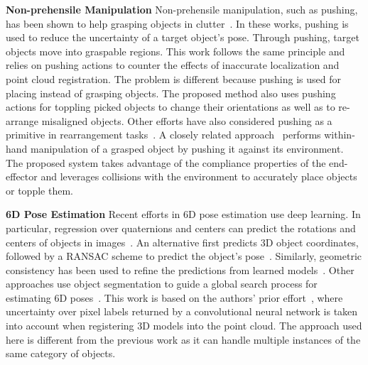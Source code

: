 \noindent \textbf{Non-prehensile Manipulation}
Non-prehensile manipulation, such as pushing, has been shown to help grasping objects in clutter~\cite{Dogar-2011-7322,Dogar22012}. In these works, pushing is used to reduce the uncertainty of a target  object's pose. Through pushing, target objects move into graspable regions. This work follows the same principle and relies on pushing actions to counter the effects of inaccurate localization and point cloud registration. The problem is different because pushing is used for placing instead of grasping objects. The proposed method also uses pushing actions for toppling picked objects to change their orientations as well as to re-arrange misaligned objects. Other efforts have also considered pushing as a primitive in rearrangement tasks~\cite{king2015nonprehensile, cosgun2011push}.  A closely related approach~\cite{chavan2015prehensile} performs within-hand manipulation of a grasped object by pushing it against its environment. The proposed system takes advantage of the compliance properties of the end-effector and leverages collisions with the environment to accurately place objects or topple them. 




\noindent \textbf{6D Pose Estimation} Recent efforts in 6D pose estimation use deep learning. In particular, regression over quaternions and centers can predict the rotations and centers of objects in images~\cite{xiang2017posecnn}. An alternative first predicts 3D object coordinates, followed by a RANSAC scheme to predict the object's pose~\cite{brachmann2014learning}. Similarly, geometric consistency has been used to refine the predictions from learned models~\cite{michel2017global}. Other approaches use object segmentation to guide a global search process for estimating 6D poses~\cite{mitash2018robust, narayanan2016discriminatively, mitash2017improving}. This work is based on the authors' prior effort~\cite{mitash2018robust}, where uncertainty over pixel labels returned by a convolutional neural network is taken into account when registering 3D models into the point cloud. The approach used here is different from the previous work as it can handle multiple instances of the same category of objects.

